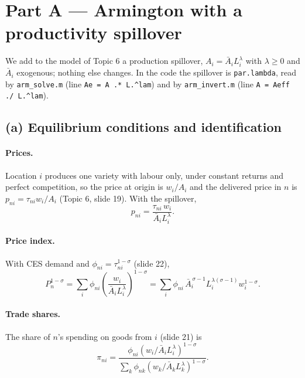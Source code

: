 \documentclass[11pt,a4paper]{article}
\begin{document}
\section*{Part A --- Armington with a productivity spillover}

We add to the model of Topic 6 a production spillover, $A_i = \bar A_iL_i^{\lambda}$ with $\lambda\ge 0$ and $\bar A_i$ exogenous; nothing else changes. In the code the spillover is \texttt{par.lambda}, read by \texttt{arm\_solve.m} (line \texttt{Ae = A .* L.\^{}lam}) and by \texttt{arm\_invert.m} (line \texttt{A = Aeff ./ L.\^{}lam}).

\subsection*{(a) Equilibrium conditions and identification}

\paragraph{Prices.} Location $i$ produces one variety with labour only, under constant returns and perfect competition, so the price at origin is $w_i/A_i$ and the delivered price in $n$ is $p_{ni}=\tau_{ni}w_i/A_i$ (Topic 6, slide 19). With the spillover,
\begin{equation}
p_{ni}=\frac{\tau_{ni}\,w_i}{\bar A_iL_i^{\lambda}} .
\end{equation}

\paragraph{Price index.} With CES demand and $\phi_{ni}=\tau_{ni}^{1-\sigma}$ (slide 22),
\begin{equation}
P_n^{1-\sigma}=\sum_{i}\phi_{ni}\left(\frac{w_i}{\bar A_iL_i^{\lambda}}\right)^{1-\sigma}
=\sum_i\phi_{ni}\,\bar A_i^{\,\sigma-1}L_i^{\lambda(\sigma-1)}w_i^{1-\sigma}.
\end{equation}

\paragraph{Trade shares.} The share of $n$'s spending on goods from $i$ (slide 21) is
\begin{equation}
\pi_{ni}=\frac{\phi_{ni}\left(w_i/\bar A_iL_i^{\lambda}\right)^{1-\sigma}}
{\sum_k\phi_{nk}\left(w_k/\bar A_kL_k^{\lambda}\right)^{1-\sigma}} .
\end{equation}
\end{document}

